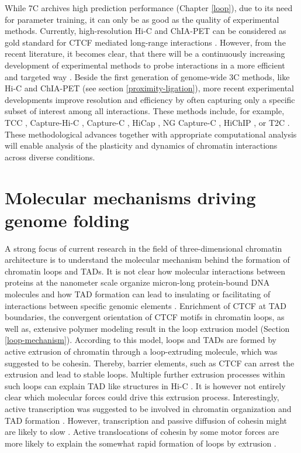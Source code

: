 \documentclass[a4paper,twoside=true,openright,parskip=full,chapterprefix=true,11pt,headings=normal,bibliography=totoc,listof=totoc,titlepage=on,captions=tableabove,draft=false]{scrreprt}
\theoremstyle{definition}
\theoremstyle{definition}
\theoremstyle{definition}
\theoremstyle{remark}
\begin{document}
While 7C archives high prediction performance (Chapter \ref{loop}), due
to its need for parameter training, it can only be as good as the
quality of experimental methods. Currently, high-resolution Hi-C and
ChIA-PET can be considered as gold standard for CTCF mediated long-range
interactions \citep{Rao2014, Tang2015}. However, from the recent
literature, it becomes clear, that there will be a continuously
increasing development of experimental methods to probe interactions in
a more efficient and targeted way
\citep{Denker2016, Schmitt2016, Davies2017}. Beside the first generation
of genome-wide 3C methods, like Hi-C and ChIA-PET (see section
\ref{proximity-ligation}), more recent experimental developments improve
resolution and efficiency by often capturing only a specific subset of
interest among all interactions. These methods include, for example, TCC
\citep{Kalhor2011}, Capture-Hi-C \citep{Dryden2014}, Capture-C
\citep{Hughes2014}, HiCap \citep{Sahlen2015}, NG Capture-C
\citep{Davies2016}, HiChIP \citep{Mumbach2016}, or T2C
\citep{Kolovos2018}. These methodological advances together with
appropriate computational analysis will enable analysis of the
plasticity and dynamics of chromatin interactions across diverse
conditions.

\hypertarget{molecular-mechanisms-driving-genome-folding}{%
\section{Molecular mechanisms driving genome
folding}\label{molecular-mechanisms-driving-genome-folding}}

A strong focus of current research in the field of three-dimensional
chromatin architecture is to understand the molecular mechanism behind
the formation of chromatin loops and TADs. It is not clear how molecular
interactions between proteins at the nanometer scale organize
micron-long protein-bound DNA molecules and how TAD formation can lead
to insulating or facilitating of interactions between specific genomic
elements \citep{Fudenberg2018}. Enrichment of CTCF at TAD boundaries,
the convergent orientation of CTCF motifs in chromatin loops, as well
as, extensive polymer modeling result in the loop extrusion model
(Section \ref{loop-mechanism}). According to this model, loops and TADs
are formed by active extrusion of chromatin through a loop-extruding
molecule, which was suggested to be cohesin. Thereby, barrier elements,
such as CTCF can arrest the extrusion and lead to stable loops. Multiple
further extrusion processes within such loops can explain TAD like
structures in Hi-C \citep{Fudenberg2016}. It is however not entirely
clear which molecular forces could drive this extrusion process.
Interestingly, active transcription was suggested to be involved in
chromatin organization and TAD formation
\citep{Ulianov2015, Rowley2017}. However, transcription and passive
diffusion of cohesin might are likely to slow \citep{Barrington2017}.
Active translocations of cohesin by some motor forces are more likely to
explain the somewhat rapid formation of loops by extrusion
\citep{Rao2017}.
\end{document}

